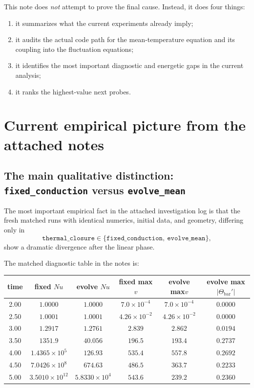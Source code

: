 \documentclass[11pt]{article}
\begin{document}
This note does \emph{not} attempt to prove the final cause. Instead, it does four things:

\begin{enumerate}
\item it summarizes what the current experiments already imply;
\item it audits the actual code path for the mean-temperature equation and its coupling into the fluctuation equations;
\item it identifies the most important diagnostic and energetic gaps in the current analysis;
\item it ranks the highest-value next probes.
\end{enumerate}

\section{Current empirical picture from the attached notes}

\subsection{The main qualitative distinction: \texttt{fixed\_conduction} versus \texttt{evolve\_mean}}

The most important empirical fact in the attached investigation log is that the fresh matched runs with identical numerics, initial data, and geometry, differing only in
\[
\texttt{thermal\_closure} \in \{\texttt{fixed\_conduction},\ \texttt{evolve\_mean}\},
\]
show a dramatic divergence after the linear phase.

The matched diagnostic table in the notes is:

\begin{center}
\begin{tabular}{@{}cccccc@{}}
\toprule
time & fixed $Nu$ & evolve $Nu$ & fixed max$v$ & evolve max$v$ & evolve max$|\Theta_{\mathrm{bar}}'|$ \\
\midrule
2.00 & $1.0000$ & $1.0000$ & $7.0\times 10^{-4}$ & $7.0\times 10^{-4}$ & $0.0000$ \\
2.50 & $1.0001$ & $1.0001$ & $4.26\times 10^{-2}$ & $4.26\times 10^{-2}$ & $0.0000$ \\
3.00 & $1.2917$ & $1.2761$ & $2.839$ & $2.862$ & $0.0194$ \\
3.50 & $1351.9$ & $40.056$ & $196.5$ & $193.4$ & $0.2737$ \\
4.00 & $1.4365\times 10^{5}$ & $126.93$ & $535.4$ & $557.8$ & $0.2692$ \\
4.50 & $7.0426\times 10^{8}$ & $674.63$ & $486.5$ & $363.7$ & $0.2233$ \\
5.00 & $3.5010\times 10^{12}$ & $5.8330\times 10^{4}$ & $543.6$ & $239.2$ & $0.2360$ \\
\bottomrule
\end{tabular}
\end{center}
\end{document}
